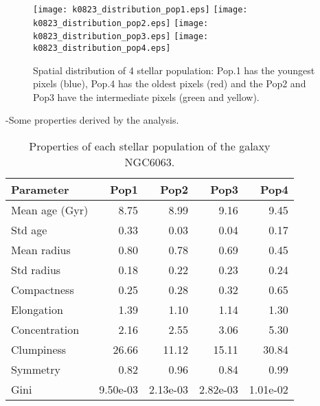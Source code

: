 \begin{figure}[bh]
\begin{center}
\texttt{[image: k0823\_distribution\_pop1.eps]}
\texttt{[image: k0823\_distribution\_pop2.eps]}
\texttt{[image: k0823\_distribution\_pop3.eps]}
\texttt{[image: k0823\_distribution\_pop4.eps]}
 \caption{Spatial distribution of 4 stellar population: Pop.1 has the youngest pixels (blue), Pop.4 has the oldest pixels (red) and the Pop2 and Pop3 have the intermediate pixels (green and yellow).}
   \label{fig1}
\end{center}
\end{figure}


-Some properties derived by the analysis.


\begin{table}[h]
\centering
\begin{tabular}{l|r|r|r|r}
Parameter & Pop1 & Pop2 & Pop3 & Pop4 \\\hline
Mean age (Gyr) & 8.75 & 8.99 & 9.16 & 9.45 \\
Std age & 0.33 & 0.03 & 0.04 & 0.17 \\
Mean radius & 0.80 & 0.78 & 0.69 & 0.45 \\
Std radius & 0.18 & 0.22 & 0.23 & 0.24 \\
Compactness & 0.25 & 0.28 & 0.32 & 0.65 \\
Elongation & 1.39 & 1.10 & 1.14 & 1.30 \\
Concentration & 2.16 & 2.55 & 3.06 & 5.30 \\
Clumpiness & 26.66 & 11.12 & 15.11 & 30.84 \\
Symmetry & 0.82 & 0.96 & 0.84 & 0.99 \\
Gini & 9.50e-03 & 2.13e-03 & 2.82e-03 & 1.01e-02 \\
\end{tabular}
\caption{\label{tab:widgets}Properties of each stellar population of the galaxy NGC6063.}
\end{table}



